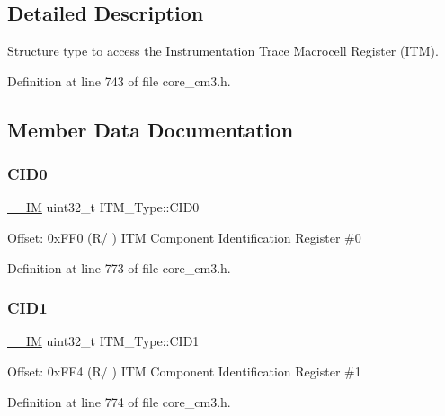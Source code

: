 \subsection{Detailed Description}
Structure type to access the Instrumentation Trace Macrocell Register (I\+TM). 

Definition at line 743 of file core\+\_\+cm3.\+h.



\subsection{Member Data Documentation}
\mbox{\label{struct_i_t_m___type_a30bb2b166b1723867da4a708935677ba}} 
\subsubsection{\texorpdfstring{C\+I\+D0}{CID0}}
{\footnotesize\ttfamily \hyperlink{core__sc300_8h_a4cc1649793116d7c2d8afce7a4ffce43}{\+\_\+\+\_\+\+IM} uint32\+\_\+t I\+T\+M\+\_\+\+Type\+::\+C\+I\+D0}

Offset\+: 0x\+F\+F0 (R/ ) I\+TM Component Identification Register \#0 

Definition at line 773 of file core\+\_\+cm3.\+h.

\mbox{\label{struct_i_t_m___type_ac40df2c3a6cef02f90b4e82c8204756f}} 
\subsubsection{\texorpdfstring{C\+I\+D1}{CID1}}
{\footnotesize\ttfamily \hyperlink{core__sc300_8h_a4cc1649793116d7c2d8afce7a4ffce43}{\+\_\+\+\_\+\+IM} uint32\+\_\+t I\+T\+M\+\_\+\+Type\+::\+C\+I\+D1}

Offset\+: 0x\+F\+F4 (R/ ) I\+TM Component Identification Register \#1 

Definition at line 774 of file core\+\_\+cm3.\+h.

\mbox{\label{struct_i_t_m___type_a8000b92e4e528ae7ac4cb8b8d9f6757d}} 
